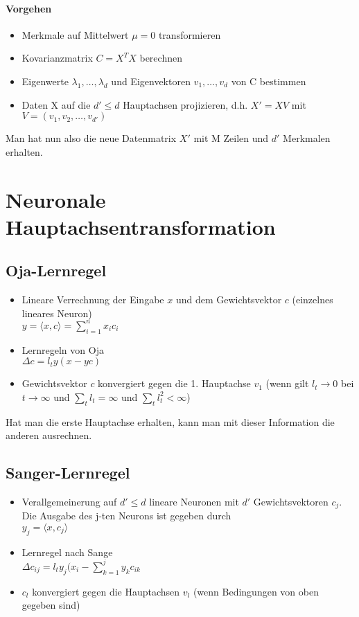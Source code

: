 \paragraph{Vorgehen}
\begin{itemize}
    \item Merkmale auf Mittelwert $\mu=0$ transformieren
    \item Kovarianzmatrix $C=X^TX$ berechnen
    \item Eigenwerte $\lambda_1,\dots,\lambda_d$ und Eigenvektoren $v_1,\dots,v_d$ von C bestimmen
    \item Daten X auf die $d'\leq d$ Hauptachsen projizieren, d.h. $X' = XV$ mit $V=(v_1,v_2,\dots,v_{d'})$
\end{itemize}

Man hat nun also die neue Datenmatrix $X'$ mit M Zeilen und $d'$ Merkmalen erhalten.

\section{Neuronale Hauptachsentransformation}
\subsection{Oja-Lernregel}
\begin{itemize}
    \item Lineare Verrechnung der Eingabe $x$ und dem Gewichtsvektor $c$ (einzelnes lineares Neuron)\\
        $y = \langle x,c \rangle = \sum_{i=1}^nx_ic_i$
    \item Lernregeln von Oja\\
        $\Delta c = l_ty(x-yc)$
    \item Gewichtsvektor $c$ konvergiert gegen die 1. Hauptachse $v_1$ (wenn gilt $l_t\to 0$ bei $t\to\infty$ und $\sum_t l_t = \infty$ und $\sum_t l_t^2<\infty$)    
\end{itemize}

\noindent Hat man die erste Hauptachse erhalten, kann man mit dieser Information die anderen ausrechnen.

\subsection{Sanger-Lernregel}
\begin{itemize}
    \item Verallgemeinerung auf $d'\leq d$ lineare Neuronen mit $d'$ Gewichtsvektoren $c_j$. Die Ausgabe des j-ten Neurons ist gegeben durch\\
    $y_j = \langle x,c_j \rangle$
    \item Lernregel nach Sange\\
        $\Delta c_{ij} = l_ty_j(x_i -\sum_{k=1}^jy_kc_{ik}$
    \item $c_l$ konvergiert gegen die Hauptachsen $v_l$ (wenn Bedingungen von oben gegeben sind)    
\end{itemize}